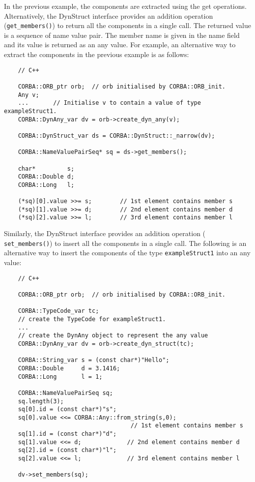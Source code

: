 \documentclass[11pt,twoside,onecolumn]{book}
\begin{document}
In the previous example, the components are extracted using the get
operations. Alternatively, the DynStruct interface provides an addition
operation ({\tt get\_members()}) to return all the components in a single
call. The returned value is a sequence of name value pair. The member name
is given in the name field and its value is returned as an any value.
For example, an alternative way to extract the components in the previous
example is as follows:

{\small
\begin{verbatim}
    // C++
    
    CORBA::ORB_ptr orb;  // orb initialised by CORBA::ORB_init.
    Any v;
    ...       // Initialise v to contain a value of type exampleStruct1.
    CORBA::DynAny_var dv = orb->create_dyn_any(v);
    
    CORBA::DynStruct_var ds = CORBA::DynStruct::_narrow(dv);
    
    CORBA::NameValuePairSeq* sq = ds->get_members();
    
    char*         s;
    CORBA::Double d;
    CORBA::Long   l;
    
    (*sq)[0].value >>= s;        // 1st element contains member s
    (*sq)[1].value >>= d;        // 2nd element contains member d
    (*sq)[2].value >>= l;        // 3rd element contains member l
\end{verbatim}
}

Similarly, the DynStruct interface provides an addition operation ({\tt
set\_members()}) to insert all the components in a single call. The
following is an alternative way to insert the components of the type
{\tt exampleStruct1} into an any value:

{\small
\begin{verbatim}
    // C++
    
    CORBA::ORB_ptr orb;  // orb initialised by CORBA::ORB_init.
    
    CORBA::TypeCode_var tc;
    // create the TypeCode for exampleStruct1.
    ...
    // create the DynAny object to represent the any value
    CORBA::DynAny_var dv = orb->create_dyn_struct(tc);
    
    CORBA::String_var s = (const char*)"Hello";
    CORBA::Double     d = 3.1416;
    CORBA::Long       l = 1;
    
    CORBA::NameValuePairSeq sq;
    sq.length(3);
    sq[0].id = (const char*)"s";
    sq[0].value <<= CORBA::Any::from_string(s,0); 
                                    // 1st element contains member s
    sq[1].id = (const char*)"d";
    sq[1].value <<= d;             // 2nd element contains member d
    sq[2].id = (const char*)"l";
    sq[2].value <<= l;             // 3rd element contains member l
    
    dv->set_members(sq);    
\end{verbatim}
}
\end{document}
